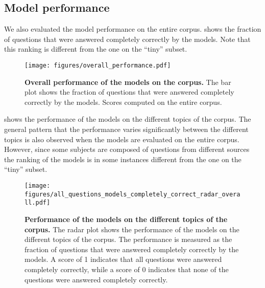 

\subsection{Model performance}
We also evaluated the model performance on the entire \chembench corpus. 
 shows the fraction of questions that were answered completely correctly by the models. 
Note that this ranking is different from the one on the \enquote{tiny} subset.

\begin{figure}[htb]
    \centering
    \texttt{[image: figures/overall\_performance.pdf]}
    \caption{\textbf{Overall performance of the models on the \chembench corpus.} The bar plot shows the fraction of questions that were answered completely correctly by the models. Scores computed on the entire \chembench corpus.}
    \label{fig:barplot_all_correct_all_questions}
\end{figure}

 shows the performance of the models on the different topics of the \chembench corpus.
The general pattern that the performance varies significantly between the different topics is also observed when the models are evaluated on the entire corpus. 
However, since some subjects are composed of questions from different sources the ranking of the models is in some instances different from the one on the \enquote{tiny} subset.

\begin{figure}[htb]
    \centering
    \texttt{[image: figures/all\_questions\_models\_completely\_correct\_radar\_overall.pdf]}
    \caption{\textbf{Performance of the models on the different topics of the \chembench corpus.} The radar plot shows the performance of the models on the different topics of the \chembench corpus. The performance is measured as the fraction of questions that were answered completely correctly by the models.
    A score of 1 indicates that all questions were answered completely correctly, while a score of 0 indicates that none of the questions were answered completely correctly.
    }
    \label{fig:all_questions_models_completely_correct_radar_overall}
\end{figure}

